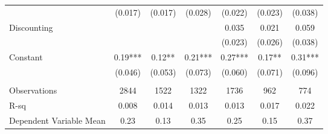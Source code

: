 \begin{tabular}{lcccccc}
      & \cellcolor[rgb]{ .839,  .863,  .894}(0.017) & \cellcolor[rgb]{ .839,  .863,  .894}(0.017) & \cellcolor[rgb]{ .839,  .863,  .894}(0.028) & \cellcolor[rgb]{ .839,  .863,  .894}(0.022) & \cellcolor[rgb]{ .839,  .863,  .894}(0.023) & \cellcolor[rgb]{ .839,  .863,  .894}(0.038) \\
Discounting &       &       &       & \cellcolor[rgb]{ .839,  .863,  .894}0.035 & 0.021 & \cellcolor[rgb]{ .839,  .863,  .894}0.059 \\
      &       &       &       & \cellcolor[rgb]{ .839,  .863,  .894}(0.023) & (0.026) & \cellcolor[rgb]{ .839,  .863,  .894}(0.038) \\
Constant  & 0.19*** & 0.12** & 0.21*** & 0.27*** & 0.17** & 0.31*** \\
      & (0.046) & (0.053) & (0.073) & (0.060) & (0.071) & (0.096) \\
      &       &       &       &       &       &  \\
\midrule
Observations & 2844  & 1522  & 1322  & 1736  & 962   & 774 \\
R-sq  & 0.008 & 0.014 & 0.013 & 0.013 & 0.017 & 0.022 \\
Dependent Variable Mean & 0.23  & 0.13  & 0.35  & 0.25  & 0.15  & 0.37 \\
\bottomrule
\bottomrule
\end{tabular}%

